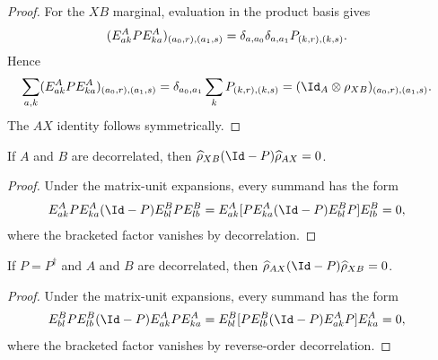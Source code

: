 \begin{proof}
    \leanok
    For the $XB$ marginal, evaluation in the product basis gives
    \begin{align}
        (E^A_{ak}P E^A_{ka})_{(a_0,r),(a_1,s)}
         & =\delta_{a,a_0}\delta_{a,a_1}P_{(k,r),(k,s)}.
        \notag
    \end{align}
    Hence
    \begin{align}
        \sum_{a,k}
        (E^A_{ak}P E^A_{ka})_{(a_0,r),(a_1,s)}
         & =\delta_{a_0,a_1}\sum_kP_{(k,r),(k,s)} =(\Id_A\otimes\rho_{XB})_{(a_0,r),(a_1,s)}.
        \notag
    \end{align}
    The $AX$ identity follows symmetrically.
\end{proof}

\begin{lemma}
    \label{thm:tripartite_marginal_complementary_product_zero}
    \leanok
    If $A$ and $B$ are decorrelated, then
    $\widehat\rho_{XB}(\Id-P)\widehat\rho_{AX}=0$.
\end{lemma}

\begin{proof}
    \leanok
    Under the matrix-unit expansions, every summand has the form
    \begin{align}
        E^A_{ak}PE^A_{ka}(\Id-P)E^B_{bl}PE^B_{lb}
         & =E^A_{ak}
            [PE^A_{ka}(\Id-P)E^B_{bl}P]
        E^B_{lb} =0,
        \notag
    \end{align}
    where the bracketed factor vanishes by decorrelation.
\end{proof}

\begin{lemma}
    \label{thm:tripartite_reverse_marginal_complementary_product_zero}
    \leanok
    If $P=P^\dagger$ and $A$ and $B$ are decorrelated, then
    $\widehat\rho_{AX}(\Id-P)\widehat\rho_{XB}=0$.
\end{lemma}

\begin{proof}
    \leanok
    Under the matrix-unit expansions, every summand has the form
    \begin{align}
        E^B_{bl}PE^B_{lb}(\Id-P)E^A_{ak}PE^A_{ka}
         & =E^B_{bl}
            [PE^B_{lb}(\Id-P)E^A_{ak}P]
        E^A_{ka} =0,
        \notag
    \end{align}
    where the bracketed factor vanishes by reverse-order decorrelation.
\end{proof}

